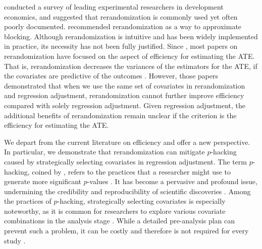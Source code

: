 \documentclass[12pt]{article}
\begin{document}
\citet{bruhn2009pursuit} conducted a survey of leading experimental researchers in development economics,
and suggested that rerandomization is commonly used yet often poorly documented. 
 \citet{gerber2012field} recommended rerandomization as a way to approximate blocking. 
Although rerandomization is intuitive and has been widely implemented in practice, its necessity has not been fully justified. Since \citet{morgan2012rerandomization}, most papers on rerandomization have focused on the aspect of efficiency for estimating the ATE. That is, rerandomization decreases the variances of the estimators for the ATE, if the covariates are predictive of the outcomes \citep{branson2016improving,morgan2012rerandomization,Li9157,wang2022rerandomization,wang2021rerandomization,2020Rerandomization}. However, those papers demonstrated that when we use the same set of covariates in rerandomization and regression adjustment, rerandomization cannot further improve efficiency compared with solely regression adjustment. Given regression adjustment, the additional benefits of rerandomization remain unclear if the criterion is the efficiency for estimating the ATE.
 
 We depart from the current literature on efficiency and offer a new perspective. In particular, we demonstrate that rerandomization can mitigate  $p$-hacking caused by strategically selecting covariates in regression adjustment. The term $p$-hacking, coined by \citet{simmons2011false}, refers to the practices that a researcher might use to
generate more significant $p$-values \citep{brodeur2020methods}.  It has become a pervasive and profound issue, undermining the credibility and reproducibility of scientific discoveries \citep{john2012measuring,ioannidis2005most}. 
 Among the practices of $p$-hacking, strategically selecting covariates is especially noteworthy, as it is common for researchers to explore various covariate combinations in the analysis stage \citep{simmons2011false}. While a detailed pre-analysis plan can prevent such a problem, it can be costly and therefore is not required for every study \citep{banerjee2020praise}.
\end{document}
